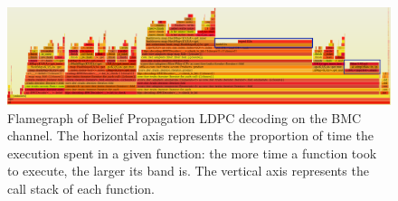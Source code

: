 \begin{figure}
    \centering
    \includegraphics[width=\textwidth]{figures/flamegraph.png}
    \caption[Flamegraph of Belief Propagation LDPC decoding on the BMC channel]{Flamegraph of Belief Propagation LDPC decoding on the BMC channel.
        The horizontal axis represents the proportion of time the execution
        spent in a given function: the more time a function took to execute, the
        larger its band is. The vertical axis represents the call stack of each
        function.%
    }
    \label{fig:flamegraph_gallager}
\end{figure}